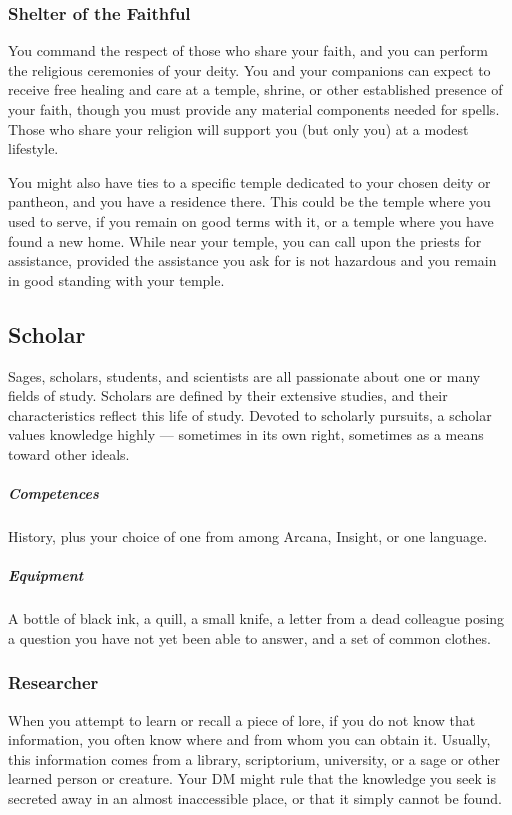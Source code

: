    \subsubsection{Shelter of the Faithful}
        You command the respect of those who share your faith, and you can perform the religious ceremonies of your deity.
        You and your companions can expect to receive free healing and care at a temple, shrine, or other established presence of your faith, though you must provide any material components needed for spells.
        Those who share your religion will support you (but only you) at a modest lifestyle.

        You might also have ties to a specific temple dedicated to your chosen deity or pantheon, and you have a residence there.
        This could be the temple where you used to serve, if you remain on good terms with it, or a temple where you have found a new home.
        While near your temple, you can call upon the priests for assistance, provided the assistance you ask for is not hazardous and you remain in good standing with your temple.

\subsection*{Scholar} \label{ssec::scholar}
    Sages, scholars, students, and scientists are all passionate about one or many fields of study.
    Scholars are defined by their extensive studies, and their characteristics reflect this life of study.
    Devoted to scholarly pursuits, a scholar values knowledge highly --- sometimes in its own right, sometimes as a means toward other ideals.
    \subparagraph{Competences} History, plus your choice of one from among Arcana, Insight, or one language.
    \subparagraph{Equipment} A bottle of black ink, a quill, a small knife, a letter from a dead colleague posing a question you have not yet been able to answer, and a set of common clothes.
    \subsubsection{Researcher}
        When you attempt to learn or recall a piece of lore, if you do not know that information, you often know where and from whom you can obtain it.
        Usually, this information comes from a library, scriptorium, university, or a sage or other learned person or creature.
        Your DM might rule that the knowledge you seek is secreted away in an almost inaccessible place, or that it simply cannot be found.

